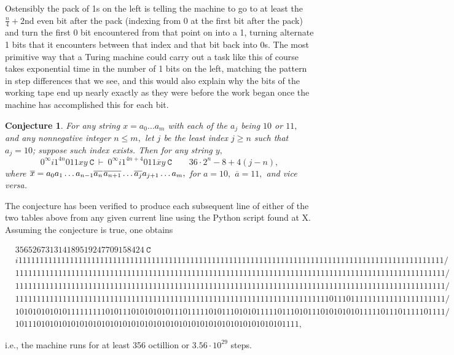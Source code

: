\documentclass[12pt]{article}
\newtheorem*{conjecture}{Conjecture}
\begin{document}
Ostensibly the pack of 1s on the left is telling the machine to go to at least the $\frac n4+2$nd even bit after the pack
(indexing from 0 at the first bit after the pack) and turn the first 0 bit encountered from that point on into a 1,
turning alternate 1 bits that it encounters between that index and that bit back into 0s. The most primitive way that
a Turing machine could carry out a task like this of course takes exponential time in the number of 1 bits on the left,
matching the pattern in step differences that we see, and this would also explain why the bits of the working tape end up
nearly exactly as they were before the work began once the machine has accomplished this for each bit. 

\newpage

\begin{conjecture}
For any string $x=a_0\ldots a_m$
with each of the $a_j$ being $10$ or $11,$
and any nonnegative integer $n\leq m,$
let $j$ be the least index $j\geq n$ such that $a_j=10$;
suppose such index exists.
Then for any string $y,$
$$0^\infty i1^{4n}011xy~\texttt{C}~\vdash~
0^\infty i1^{4n+4}011\overline xy~\texttt{C}\quad\quad36\cdot2^n-8+4(j-n),$$
where $\overline x = 
a_0a_1\ldots a_{n-1}\overline{a_{n}}\hspace{.08883em}\overline{a_{n+1}}\ldots\overline{a_j}
a_{j+1}\ldots a_m,$ for $a=10,$ $\overline a=11,$ and vice versa.
\end{conjecture}

The conjecture has been verified to produce each subsequent line of either of the two tables above
from any given current line using the Python script found at X. Assuming the conjecture is true,
one obtains
\begin{tiny}
\begin{align*}
&356526731314189519247709158424~\texttt{C}\\
&i111111111111111111111111111111111111111111111111111111111111111111111111111111111111111111111111111/\\
&1111111111111111111111111111111111111111111111111111111111111111111111111111111111111111111111111111/\\
&1111111111111111111111111111111111111111111111111111111111111111111111111111111111111111111111111111/\\
&1111111111111111111111111111111111111111111111111111111111111111111111111011101111111111111111111111/\\
&1010101010101111111110101110101010101110111110101110101011111011101011101010101011111011101111101111/\\
&101110101010101010101010101010101010101010101010101010101010101111,
\end{align*}
\end{tiny}
i.e., the machine runs for at least 356 octillion or $3.56\cdot10^{29}$ steps.
\end{document}
